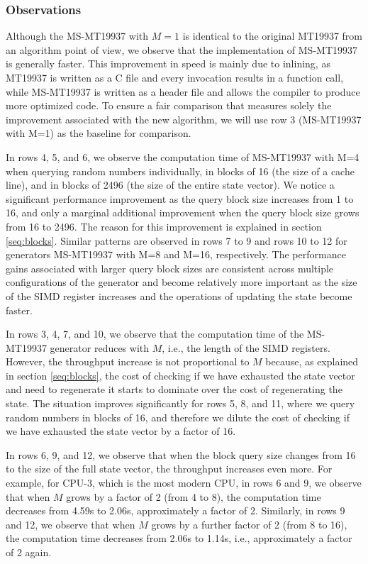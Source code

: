 \documentclass[preprint,1p,times]{elsarticle}
\begin{document}
\subsubsection{Observations}
\noindent Although the MS-MT19937 with $M=1$ is identical to the original MT19937 from an algorithm point of view, we observe that the implementation of MS-MT19937 is generally faster. This improvement in speed is mainly due to inlining, as MT19937 is written as a C file and every invocation results in a function call, while MS-MT19937 is written as a header file and allows the compiler to produce more optimized code. To ensure a fair comparison that measures solely the improvement associated with the new algorithm, we will use row 3 (MS-MT19937 with M=1) as the baseline for comparison.

\noindent In rows 4, 5, and 6, we observe the computation time of MS-MT19937 with M=4 when querying random numbers individually, in blocks of 16 (the size of a cache line), and in blocks of 2496 (the size of the entire state vector). We notice a significant performance improvement as the query block size increases from 1 to 16, and only a marginal additional improvement when the query block size grows from 16 to 2496. The reason for this improvement is explained in section \ref{seq:blocks}. Similar patterns are observed in rows 7 to 9 and rows 10 to 12 for generators MS-MT19937 with M=8 and M=16, respectively. The performance gains associated with larger query block sizes are consistent across multiple configurations of the generator and become relatively more important as the size of the SIMD register increases and the operations of updating the state become faster.

\noindent In rows 3, 4, 7, and 10, we observe that the computation time of the MS-MT19937 generator reduces with $M$, i.e., the length of the SIMD registers. However, the throughput increase is not proportional to $M$ because, as explained in section \ref{seq:blocks}, the cost of checking if we have exhausted the state vector and need to regenerate it starts to dominate over the cost of regenerating the state. The situation improves significantly for rows 5, 8, and 11, where we query random numbers in blocks of 16, and therefore we dilute the cost of checking if we have exhausted the state vector by a factor of 16.

\noindent In rows 6, 9, and 12, we observe that when the block query size changes from 16 to the size of the full state vector, the throughput increases even more. For example, for CPU-3, which is the most modern CPU, in rows 6 and 9, we observe that when $M$ grows by a factor of 2 (from 4 to 8), the computation time decreases from 4.59s to 2.06s, approximately a factor of 2. Similarly, in rows 9 and 12, we observe that when $M$ grows by a further factor of 2 (from 8 to 16), the computation time decreases from 2.06s to 1.14s, i.e., approximately a factor of 2 again.
\end{document}
